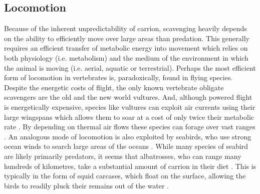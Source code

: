 \documentclass[a4paper,12pt]{article}
\begin{document}
\subsection*{Locomotion}
Because of the inherent unpredictability of carrion, scavenging heavily depends on the ability to efficiently move over large areas than predation.
This generally requires an efficient transfer of metabolic energy into movement which relies on both physiology (i.e. metabolism) and the medium of the environment in which the animal is moving (i.e. aerial, aquatic or terrestrial).
Perhaps the most efficient form of locomotion in vertebrates is, paradoxically, found in flying species. 
Despite the energetic costs of flight, the only known vertebrate obligate scavengers are the old and the new world vultures. 
And, although powered flight is energetically expensive, species like vultures can exploit air currents using their large wingspans which allows them to soar at a cost of only twice their metabolic rate \citep{hedenstrom1993migration,spivey2014analysing}.
By depending on thermal air flows these species can forage over vast ranges \citep{spiegel2013factors}. 
An analogous mode of locomotion is also exploited by seabirds, who use strong ocean winds to search large areas of the oceans \citep{norberg2012vertebrate,thaxter2012seabird}. 
While many species of seabird are likely primarily predators, it seems that albatrosses, who can range many hundreds of kilometres, take a substantial amount of carrion in their diet \citep{croxall1994dead}. 
This is typically in the form of squid carcases, which float on the surface, allowing the birds to readily pluck their remains out of the water \citep{croxall1994dead}. 
\end{document}
